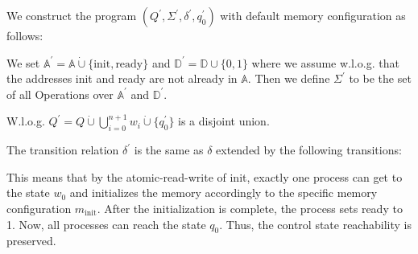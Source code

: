 We construct the program $(Q^\prime,\Sigma^\prime,\delta^\prime,q_0^\prime)$ with default memory configuration as follows:

We set $\mathds{A}^\prime = \mathds{A} \dot\cup \{\text{init},\text{ready}\}$ and $\mathds{D}^\prime = \mathds{D} \cup \{0,1\}$ where we assume w.l.o.g. that the addresses init and ready are not already in $\mathds{A}$. Then we define $\Sigma^\prime$ to be the set of all Operations over $\mathds{A}^\prime$ and $\mathds{D}^\prime$.

W.l.o.g. $Q^\prime = Q \dot\cup \bigcup_{i=0}^{n+1} w_i \dot\cup \{q_0^\prime\}$ is a disjoint union.

The transition relation $\delta^\prime$ is the same as $\delta$ extended by the following transitions:
\begin{figure}[h]
\end{figure}

This means that by the atomic-read-write of init, exactly one process can get to the state $w_0$ and initializes the memory accordingly to the specific memory configuration $m_{\text{init}}$. After the initialization is complete, the process sets ready to 1. Now, all processes can reach the state $q_0$. Thus, the control state reachability is preserved.
